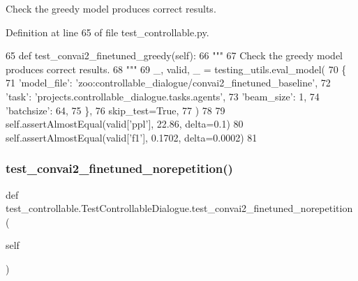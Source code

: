 \begin{DoxyVerb}Check the greedy model produces correct results.
\end{DoxyVerb}
 

Definition at line 65 of file test\+\_\+controllable.\+py.


\begin{DoxyCode}
65     \textcolor{keyword}{def }test\_convai2\_finetuned\_greedy(self):
66         \textcolor{stringliteral}{"""}
67 \textcolor{stringliteral}{        Check the greedy model produces correct results.}
68 \textcolor{stringliteral}{        """}
69         \_, valid, \_ = testing\_utils.eval\_model(
70             \{
71                 \textcolor{stringliteral}{'model\_file'}: \textcolor{stringliteral}{'zoo:controllable\_dialogue/convai2\_finetuned\_baseline'},
72                 \textcolor{stringliteral}{'task'}: \textcolor{stringliteral}{'projects.controllable\_dialogue.tasks.agents'},
73                 \textcolor{stringliteral}{'beam\_size'}: 1,
74                 \textcolor{stringliteral}{'batchsize'}: 64,
75             \},
76             skip\_test=\textcolor{keyword}{True},
77         )
78 
79         self.assertAlmostEqual(valid[\textcolor{stringliteral}{'ppl'}], 22.86, delta=0.1)
80         self.assertAlmostEqual(valid[\textcolor{stringliteral}{'f1'}], 0.1702, delta=0.0002)
81 
\end{DoxyCode}
\mbox{\label{classtest__controllable_1_1TestControllableDialogue_a12a49b51265fc21d9f1fe7a8dc45538a}} 
\subsubsection{\texorpdfstring{test\+\_\+convai2\+\_\+finetuned\+\_\+norepetition()}{test\_convai2\_finetuned\_norepetition()}}
{\footnotesize\ttfamily def test\+\_\+controllable.\+Test\+Controllable\+Dialogue.\+test\+\_\+convai2\+\_\+finetuned\+\_\+norepetition (\begin{DoxyParamCaption}\item[{}]{self }\end{DoxyParamCaption})}

